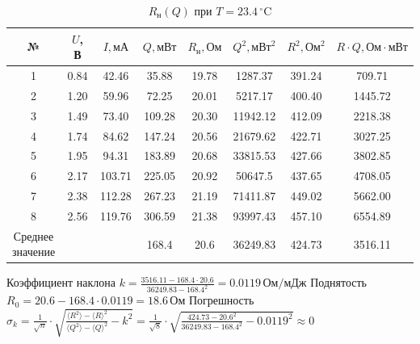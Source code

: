 \documentclass[a4paper, 10pt, twocolumn]{article}
\begin{document}
    \begin{table}[H] 
        \centering
        \begin{tabular}{|c|c|c|c|c|c|c|c|} \hline
        № & \(U\), В & \(I, \text{мА}\) & \( Q, \text{мВт} \) & \(R_\text{н}, \text{Ом}\) & \(Q^2, \text{мВт}^2 \) & \(R^2, \text{Ом}^2\) & \(R \cdot Q, \text{Ом}\cdot\text{мВт}\) \\ \hline
        1 & 0.84 & 42.46  & 35.88  & 19.78 & 1287.37 & 391.24 & 709.71  \\ \hline
        2 & 1.20 & 59.96  & 72.25  & 20.01 & 5217.17 & 400.40 & 1445.72 \\ \hline
        3 & 1.49 & 73.40  & 109.28 & 20.30 & 11942.12 & 412.09 & 2218.38 \\ \hline
        4 & 1.74 & 84.62  & 147.24 & 20.56 & 21679.62 & 422.71 & 3027.25 \\ \hline
        5 & 1.95 & 94.31  & 183.89 & 20.68 & 33815.53 & 427.66 & 3802.85 \\ \hline
        6 & 2.17 & 103.71 & 225.05 & 20.92 & 50647.5 & 437.65 & 4708.05 \\ \hline
        7 & 2.38 & 112.28 & 267.23 & 21.19 & 71411.87 & 449.02 & 5662.00 \\ \hline
        8 & 2.56 & 119.76 & 306.59 & 21.38 & 93997.43 & 457.10 & 6554.89 \\ \hline
        \shortstack{Среднее \\ значение} & & & 168.4 & 20.6 & 36249.83 & 424.73 & 3516.11 \\ \hline
        \end{tabular}
        \caption{\(R_\text{н}(Q)\) при \(T = 23.4 \, ^\circ\text{C}\)}
    \end{table}
    Коэффициент наклона $k = \frac{3516.11 - 168.4 \cdot 20.6}{36249.83 - 168.4^2} = 0.0119 \, \text{Ом}/\text{мДж}$ \newline
    Поднятость $R_0 = 20.6 - 168.4 \cdot 0.0119 = 18.6 \, \text{Ом}$
    Погрешность $\sigma_k = \frac{1}{\sqrt{n}}\cdot \sqrt{\frac{\langle R^2 \rangle - \langle R \rangle ^2}{\langle Q^2 \rangle - \langle Q \rangle ^2} - k^2} = 
    \frac{1}{\sqrt{8}}\cdot\sqrt{\frac{424.73 - 20.6^2}{36249.83 - 168.4^2} - 0.0119^2} \approx 0 $
\end{document}
